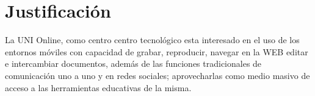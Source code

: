 
\chapter{Justificaci\'on}

La UNI Online, como centro centro tecnol\'ogico esta interesado en el uso de los entornos m\'oviles con capacidad de grabar, reproducir, navegar en la WEB editar e intercambiar documentos, adem\'as de las funciones tradicionales de comunicaci\'on uno a uno y en redes sociales; aprovecharlas como medio masivo de acceso a las herramientas educativas de la misma.
